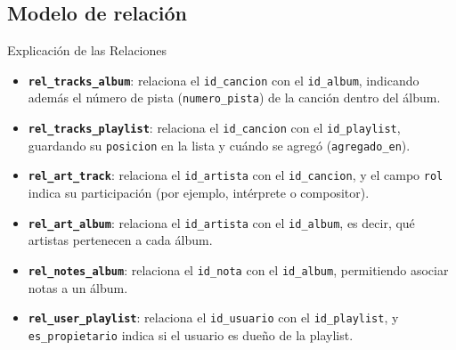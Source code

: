 \documentclass[aspectratio=169, 10pt]{beamer}
\begin{document}
\subsection{Modelo de relación}
\begin{frame}[t]{Explicación de las Relaciones}
    \small
    \begin{itemize}
        \setlength{\itemsep}{6pt}

        \item \textbf{\texttt{rel\_tracks\_album}}: relaciona el
        \texttt{id\_cancion} con el \texttt{id\_album}, indicando
        además el número de pista (\texttt{numero\_pista}) de la
        canción dentro del álbum.

        \item \textbf{\texttt{rel\_tracks\_playlist}}: relaciona el
        \texttt{id\_cancion} con el \texttt{id\_playlist}, guardando
        su \texttt{posicion} en la lista y cuándo se agregó
        (\texttt{agregado\_en}).

        \item \textbf{\texttt{rel\_art\_track}}: relaciona el
        \texttt{id\_artista} con el \texttt{id\_cancion}, y el campo
        \texttt{rol} indica su participación (por ejemplo, intérprete
        o compositor).

        \item \textbf{\texttt{rel\_art\_album}}: relaciona el
        \texttt{id\_artista} con el \texttt{id\_album}, es decir,
        qué artistas pertenecen a cada álbum.

        \item \textbf{\texttt{rel\_notes\_album}}: relaciona el
        \texttt{id\_nota} con el \texttt{id\_album}, permitiendo
        asociar notas a un álbum.

        \item \textbf{\texttt{rel\_user\_playlist}}: relaciona el
        \texttt{id\_usuario} con el \texttt{id\_playlist}, y
        \texttt{es\_propietario} indica si el usuario es dueño de la
        playlist.
    \end{itemize}
\end{frame}
\end{document}
